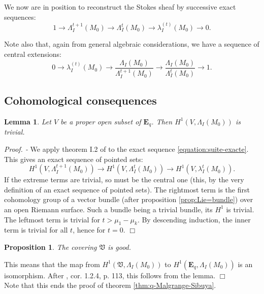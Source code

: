 \documentclass[english]{smfart}
\newtheorem{lemma}[thm]{Lemma}
\newtheorem{prop}[thm]{Proposition}
\numberwithin{equation}{thm}
\def \Pr {\textsl{Proof. - }}
\def\Eq{{\mathbf{E}_{q}}}
\def\V{{\mathfrak{V}}}
\def\la{\lambda}
\def\La{\Lambda}
\begin{document}
We now are in position to reconstruct the Stokes sheaf by successive
exact sequences:
\begin{equation} \label{equation:suite-exacte}
1 \rightarrow \La_{I}^{t+1}(M_{0}) \rightarrow
\La_{I}^{t}(M_{0}) \rightarrow \lambda_{I}^{(t)}(M_{0})
\rightarrow 0.
\end{equation}

Note also that, again from general algebraic considerations,
we have a sequence of central extensions:
\begin{equation} \label{equation:extension-centrale}
0 \rightarrow \lambda_{I}^{(t)}(M_{0}) \rightarrow
\frac{\La_{I}(M_{0})}{\La_{I}^{t+1}(M_{0})} \rightarrow
\frac{\La_{I}(M_{0})}{\La_{I}^{t}(M_{0})} \rightarrow 1.
\end{equation}


\subsection{Cohomological consequences}

\begin{lemma}
Let $V$ be a proper open subset of $\Eq$.
Then $H^{1}(V,\La_{I}(M_{0}))$ is trivial.
\end{lemma}

\Pr
We apply theorem I.2 of \cite{Frenkel} to the exact sequence
\ref{equation:suite-exacte}. This gives an exact sequence of
pointed sets:
$$
H^{1}(V,\La_{I}^{t+1}(M_{0})) \rightarrow 
H^{1}(V,\La_{I}^{t}(M_{0})) \rightarrow 
H^{1}(V,\la_{I}^{t}(M_{0})).
$$
If the extreme terms are trivial, so must be the central one
(this, by the very definition of an exact sequence of pointed
sets). The rightmost term is the first cohomology group of
a vector bundle (after proposition \ref{prop:Lie=bundle})
over an open Riemann surface. Such a bundle being a trivial
bundle, its $H^{1}$ is trivial. The leftmost term is trivial
for $t > \mu_{1} - \mu_{k}$. By descending induction, the
inner term is trivial for all $t$, hence for $t = 0$.
\hfill $\Box$

\begin{prop} \label{prop:bon-recouvrement}
The covering $\V$ is good.
\end{prop}

This means that the map from $H^{1}(\V,\La_{I}(M_{0}))$
to $H^{1}(\Eq,\La_{I}(M_{0}))$ is an isomorphism. After
\cite{BV}, cor. 1.2.4, p. 113, this follows from the
lemma.
\hfill $\Box$ \\

Note that this ends the proof of theorem \ref{thm:q-Malgrange-Sibuya}.
\end{document}
